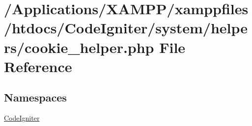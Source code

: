 \hypertarget{cookie__helper_8php}{}\section{/\+Applications/\+X\+A\+M\+P\+P/xamppfiles/htdocs/\+Code\+Igniter/system/helpers/cookie\+\_\+helper.php File Reference}
\label{cookie__helper_8php}
\subsection*{Namespaces}
\begin{DoxyCompactItemize}
\item 
 \mbox{\hyperlink{namespace_code_igniter}{Code\+Igniter}}
\end{DoxyCompactItemize}
